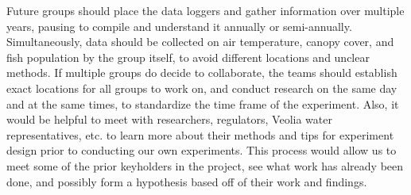 \documentclass{article}
\begin{document}
Future groups should place the data loggers and gather information over multiple years, pausing to compile and understand it annually or semi-annually. Simultaneously, data should be collected on air temperature, canopy cover, and fish population by the group itself, to avoid different locations and unclear methods. If multiple groups do decide to collaborate, the teams should establish exact locations for all groups to work on, and conduct research on the same day and at the same times, to standardize the time frame of the experiment. Also, it would be helpful to meet with researchers, regulators, Veolia water representatives, etc. to learn more about their methods and tips for experiment design prior to conducting our own experiments. This process would allow us to meet some of the prior keyholders in the project, see what work has already been done, and possibly form a hypothesis based off of their work and findings.
\end{document}

